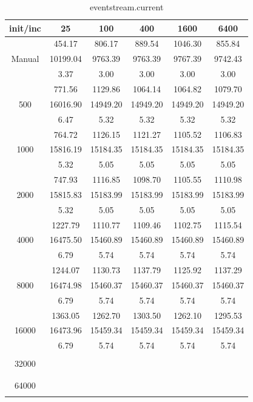 {\begin{table}[th]
\caption{eventstream.current}
\label{tab:eventstream.current}
\centering
\begin{tabular}{|c||c|c|c|c|c|}
\hline
init/inc & 25 & 100 & 400 & 1600 & 6400 \\ \hline \hline
       & 454.17   & 806.17  & 889.54  & 1046.30 & 855.84 \\
Manual & 10199.04 & 9763.39 & 9763.39 & 9767.39 & 9742.43 \\
       & 3.37     & 3.00    & 3.00    & 3.00    & 3.00 \\ \hline
  & 771.56 & 1129.86 & 1064.14 & 1064.82 & 1079.70\\ 
500  & 16016.90 & 14949.20 & 14949.20 & 14949.20 & 14949.20\\ 
  & 6.47 & 5.32 & 5.32 & 5.32 & 5.32\\ \hline 
  & 764.72 & 1126.15 & 1121.27 & 1105.52 & 1106.83\\ 
1000  & 15816.19 & 15184.35 & 15184.35 & 15184.35 & 15184.35\\ 
  & 5.32 & 5.05 & 5.05 & 5.05 & 5.05\\ \hline 
  & 747.93 & 1116.85 & 1098.70 & 1105.55 & 1110.98\\ 
2000  & 15815.83 & 15183.99 & 15183.99 & 15183.99 & 15183.99\\ 
  & 5.32 & 5.05 & 5.05 & 5.05 & 5.05\\ \hline 
  & 1227.79 & 1110.77 & 1109.46 & 1102.75 & 1115.54\\ 
4000  & 16475.50 & 15460.89 & 15460.89 & 15460.89 & 15460.89\\ 
  & 6.79 & 5.74 & 5.74 & 5.74 & 5.74\\ \hline 
  & 1244.07 & 1130.73 & 1137.79 & 1125.92 & 1137.29\\ 
8000  & 16474.98 & 15460.37 & 15460.37 & 15460.37 & 15460.37\\ 
  & 6.79 & 5.74 & 5.74 & 5.74 & 5.74\\ \hline 
  & 1363.05 & 1262.70 & 1303.50 & 1262.10 & 1295.53\\ 
16000  & 16473.96 & 15459.34 & 15459.34 & 15459.34 & 15459.34\\ 
  & 6.79 & 5.74 & 5.74 & 5.74 & 5.74\\ \hline 
  &  &  &  &  & \\ 
32000  &  &  &  &  & \\ 
  &  &  &  &  & \\ \hline 
  &  &  &  &  & \\ 
64000  &  &  &  &  & \\ 
  &  &  &  &  & \\ \hline 
\end{tabular}
\end{table}

}
